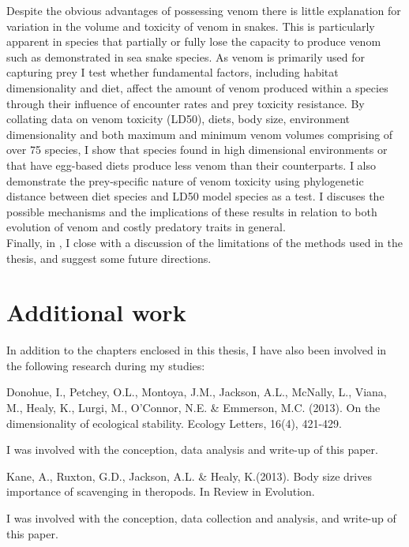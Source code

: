 Despite the obvious advantages of possessing venom there is little explanation for variation in the volume and toxicity of venom in snakes. This is particularly apparent in species that partially or fully lose the capacity to produce venom such as demonstrated in sea snake species. As venom is primarily used for capturing prey I test whether fundamental factors, including habitat dimensionality and diet, affect the amount of venom produced within a species through their influence of encounter rates and prey toxicity resistance. By collating data on venom toxicity (LD50), diets, body size, environment dimensionality and both maximum and minimum venom volumes comprising of over 75 species, I show that species found in high dimensional environments or that have egg-based diets produce less venom than their counterparts. I also demonstrate the prey-specific nature of venom toxicity using phylogenetic distance between diet species and LD50 model species as a test. I discuses the possible mechanisms and the implications of these results in relation to both evolution of venom and costly predatory traits in general.\\

%
%
Finally, in , I close with a discussion of the
limitations of the methods used in the thesis, and suggest some future
directions.

\section{\uppercase{A}dditional work}
In addition to the chapters enclosed in this thesis, I have also been involved in the following research during my studies:\\

\begin{singlespace}
Donohue, I., Petchey, O.L., Montoya, J.M., Jackson, A.L., McNally, L., Viana, M., Healy, K., Lurgi, M., O’Connor, N.E. \& Emmerson, M.C. (2013). On the dimensionality of ecological stability. Ecology Letters, 16(4), 421-429. \\
\end{singlespace}

\noindent
I was involved with the conception, data analysis and write-up of this paper. \\

\begin{singlespace}
Kane, A., Ruxton, G.D., Jackson, A.L. \& Healy, K.(2013). Body size drives importance of scavenging in theropods. In Review in Evolution. \\
\end{singlespace}

\noindent
I was involved with the conception, data collection and analysis, and write-up of this paper. \\






